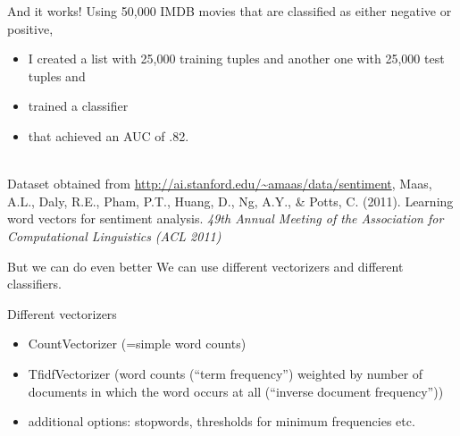 \documentclass{beamer}
\begin{document}
		
		\begin{frame}{And it works!}
			Using 50,000 IMDB movies that are classified as either negative or positive,
			\begin{itemize}
				\item I created a list with 25,000 training tuples and another one with 25,000 test tuples and
				\item trained a classifier
				\item that achieved an AUC of .82.
			\end{itemize}
			~\\
			\tiny{Dataset obtained from \url{http://ai.stanford.edu/~amaas/data/sentiment}, Maas, A.L., Daly, R.E., Pham, P.T., Huang, D., Ng, A.Y., \& Potts, C. (2011). Learning word vectors for sentiment analysis. \emph{49th Annual Meeting of the Association for Computational Linguistics (ACL 2011)}
			}
			
		\end{frame}
		
%			
%			
%		
		
		
		
		\begin{frame}{But we can do even better}
			We can use different vectorizers and different classifiers.
		\end{frame}
		
		\begin{frame}{Different vectorizers}
			\begin{itemize}
				\item CountVectorizer (=simple word counts)
				\item TfidfVectorizer (word counts (``term frequency'') weighted by number of documents in which the word occurs at all (``inverse document frequency''))
				\item additional options: stopwords, thresholds for minimum frequencies etc.
			\end{itemize}
		\end{frame}
		
\end{document}
